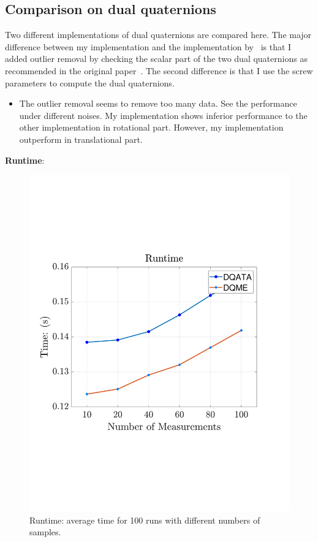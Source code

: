 \subsection{Comparison on dual quaternions}
Two different implementations of dual quaternions are compared here. The major difference between my implementation and the implementation by~\cite{pachtrachai2018adjoint} is that I added outlier removal by checking the scalar part of the two dual quaternions as recommended in the original paper~\cite{daniilidis1999hand}. The second difference is that I use the screw parameters to compute the dual quaternions.
\begin{itemize}
	\item The outlier removal seems to remove too many data. See the performance under different noises. My implementation shows inferior performance to the other implementation in rotational part. However, my implementation outperform in translational part.
\end{itemize}


\textbf{Runtime}:
\begin{figure}
\centering
\includegraphics[scale=0.4]{./hand_eye_figures/dq/dq_runtime_cmp}
\caption{Runtime: average time for 100 runs with different numbers of samples.}
\end{figure}

